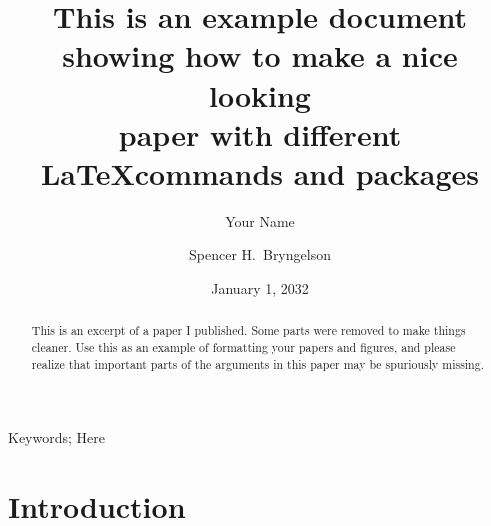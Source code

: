 



\hypersetup{
  linkcolor=darkrust,
  citecolor=seagreen,
  urlcolor=darkrust,
  pdfauthor=author,
}

\begin{frontmatter}

\title{{\large\bfseries This is an example document showing how to make a nice looking \\ paper with different \LaTeX commands and packages}}

\author[1]{\vspace{-3ex}Your Name}
\author[2]{Spencer H.\ Bryngelson}

\address[1]{Some other School, Georgia Institute of Technology, Atlanta, GA 30332, USA}
\address[2]{School of Computational Science \& Engineering, Georgia Institute of Technology, Atlanta, GA 30332, USA}

\date{January 1, 2032}

\begin{abstract}
    This is an excerpt of a paper I published.
    Some parts were removed to make things cleaner.
    Use this as an example of formatting your papers and figures, and please realize that important parts of the arguments in this paper may be spuriously missing.
\end{abstract}

\begin{keyword}
   Keywords; Here 
\end{keyword}

\end{frontmatter}

\section{Introduction}

